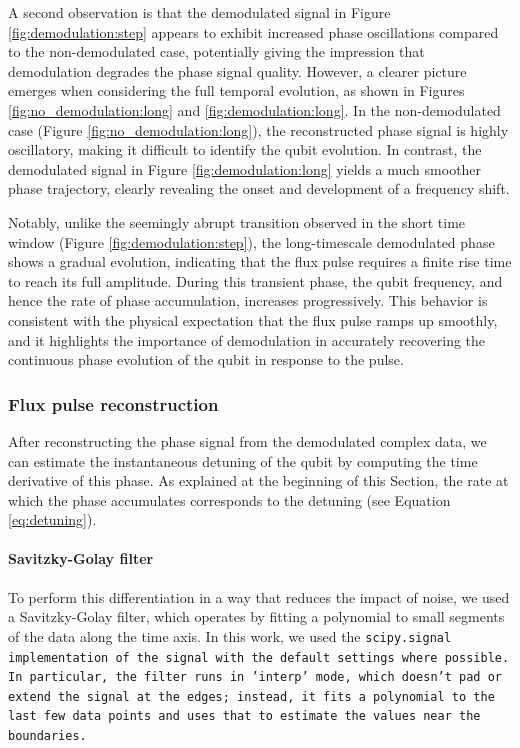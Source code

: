 A second observation is that the demodulated signal in Figure \ref{fig:demodulation:step} appears to exhibit increased phase oscillations compared to the non-demodulated case, potentially giving the impression that demodulation degrades the phase signal quality. 
However, a clearer picture emerges when considering the full temporal evolution, as shown in Figures \ref{fig:no_demodulation:long} and \ref{fig:demodulation:long}. 
In the non-demodulated case (Figure \ref{fig:no_demodulation:long}), the reconstructed phase signal is highly oscillatory, making it difficult to identify the qubit evolution. 
In contrast, the demodulated signal in Figure \ref{fig:demodulation:long} yields a much smoother phase trajectory, clearly revealing the onset and development of a frequency shift.

Notably, unlike the seemingly abrupt transition observed in the short time window (Figure \ref{fig:demodulation:step}), the long-timescale demodulated phase shows a gradual evolution, indicating that the flux pulse requires a finite rise time to reach its full amplitude. 
During this transient phase, the qubit frequency, and hence the rate of phase accumulation, increases progressively. 
This behavior is consistent with the physical expectation that the flux pulse ramps up smoothly, and it highlights the importance of demodulation in accurately recovering the continuous phase evolution of the qubit in response to the pulse.

\subsubsection{Flux pulse reconstruction}
After reconstructing the phase signal from the demodulated complex data, we can estimate the instantaneous detuning of the qubit by computing the time derivative of this phase. 
As explained at the beginning of this Section, the rate at which the phase accumulates corresponds to the detuning (see Equation \ref{eq:detuning}). 

\paragraph{Savitzky-Golay filter}
To perform this differentiation in a way that reduces the impact of noise, we used a Savitzky-Golay filter, which operates by fitting a polynomial to small segments of the data along the time axis. In this work, we used the \tt{scipy.signal} implementation of the signal with the default settings where possible. 
In particular, the filter runs in \tt{'interp'} mode, which doesn't pad or extend the signal at the edges; instead, it fits a polynomial to the last few data points and uses that to estimate the values near the boundaries.

